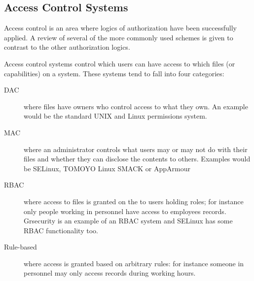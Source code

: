 \documentclass[a4paper,sfsidenotes]{%
  scrartcl%
}
\begin{document}
\begin{algorithm}[H]
\end{algorithm}



\subsection{Access Control Systems}

Access control is an area where logics of authorization have been successfully
applied. A review of several of the more commonly used schemes is given to contrast
to the other authorization logics.

Access control systems control which users can have access to which
files (or capabilities) on a system.  These systems tend to fall into four categories:

\begin{description}
  \item[\ac{DAC}] where files have owners who control access to what they own.
    An example would be the standard UNIX and Linux permissions system.
  \item[\ac{MAC}] where an administrator controls what users may or may not do
    with their files and whether they can disclose the contents to others.
    Examples would be SELinux, TOMOYO Linux SMACK or AppArmour
  \item[\ac{RBAC}] where access to files is granted on the to users holding
    roles; for instance only people working in personnel have access to
    employees records.  Grsecurity is an example of an \ac{RBAC} system and SELinux has some \ac{RBAC} functionality too.
  \item[Rule-based] where access is granted based on arbitrary rules: for
    instance someone in personnel may only access records during working hours.
\end{description}
\end{document}
